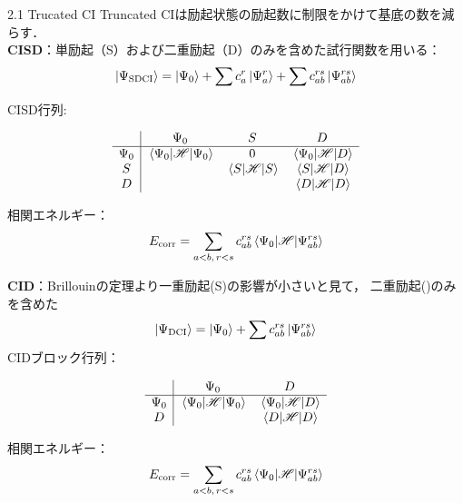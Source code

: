 \documentclass{beamer}
\begin{document}
  \begin{frame}{2.1 Trucated CI}
  Truncated CIは励起状態の励起数に制限をかけて基底の数を減らす．\\
  \textbf{CISD}：単励起（S）および二重励起（D）のみを含めた試行関数を用いる：
  \begin{align*}
  \ket{\Psi_{\text{SDCI}}} = \ket{\Psi_0} + \sum c_a^r \ket{\Psi_a^r} + \sum c_{ab}^{rs} \ket{\Psi_{ab}^{rs}}
  \end{align*}
  
  CISD行列:

  \[ 
  \begin{array}{c|ccc}
        & \Psi_0 & S & D \\ \hline
  \Psi_0 & \mel{\Psi_0}{\mathscr{H}}{\Psi_0} & 0 & \mel{\Psi_0}{\mathscr{H}}{D} \\
  S      &        & \mel{S}{\mathscr{H}}{S} & \mel{S}{\mathscr{H}}{D} \\
  D      &        &         & \mel{D}{\mathscr{H}}{D} \\
  \end{array}
  \]

  
  相関エネルギー：
  \begin{align*}
  E_{\mathrm{corr}} = \sum_{a<b,\, r<s} c_{ab}^{rs} \mel{\Psi_0}{\mathscr{H}}{\Psi_{ab}^{rs}}
  \end{align*}
  \end{frame}
  
  \begin{frame}{}

  \textbf{CID}：Brillouinの定理より一重励起(S)の影響が小さいと見て，
  二重励起()のみを含めた
  \begin{align*}
    \ket{\Psi_{\text{DCI}}} = \ket{\Psi_0} + \sum c_{ab}^{rs} \ket{\Psi_{ab}^{rs}}
  \end{align*}
  CIDブロック行列：

  \[ 
  \begin{array}{c|cc}
        & \Psi_0 & D \\ \hline
  \Psi_0 & \mel{\Psi_0}{\mathscr{H}}{\Psi_0} & \mel{\Psi_0}{\mathscr{H}}{D} \\
  D      &        & \mel{D}{\mathscr{H}}{D} \\
  \end{array}
  \]
  
  相関エネルギー：
  \begin{align*}
    E_{\mathrm{corr}} = \sum_{a<b,\, r<s} c_{ab}^{rs} \mel{\Psi_0}{\mathscr{H}}{\Psi_{ab}^{rs}}
    \end{align*}
  \end{frame}
  
\end{document}
